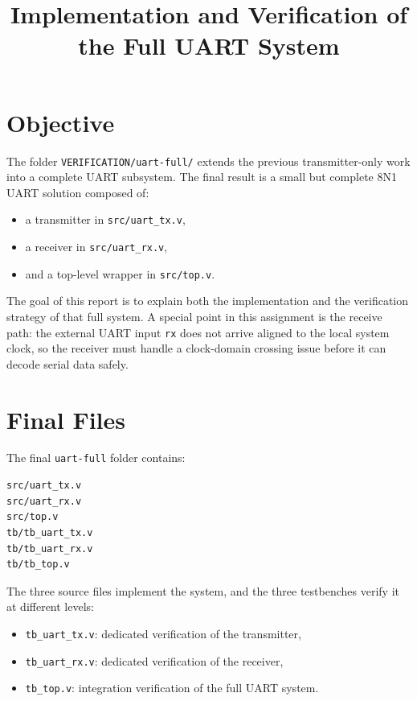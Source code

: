 \documentclass[12pt]{article}
\title{Implementation and Verification of the Full UART System}
\author{}
\date{}
\begin{document}
\maketitle

\section{Objective}

The folder \texttt{VERIFICATION/uart-full/} extends the previous
transmitter-only work into a complete UART subsystem. The final result is a
small but complete 8N1 UART solution composed of:

\begin{itemize}
    \item a transmitter in \texttt{src/uart\_tx.v},
    \item a receiver in \texttt{src/uart\_rx.v},
    \item and a top-level wrapper in \texttt{src/top.v}.
\end{itemize}

The goal of this report is to explain both the implementation and the
verification strategy of that full system. A special point in this assignment is
the receive path: the external UART input \texttt{rx} does not arrive aligned to
the local system clock, so the receiver must handle a clock-domain crossing
issue before it can decode serial data safely.

\section{Final Files}

The final \texttt{uart-full} folder contains:

\begin{lstlisting}[language=bash]
src/uart_tx.v
src/uart_rx.v
src/top.v
tb/tb_uart_tx.v
tb/tb_uart_rx.v
tb/tb_top.v
\end{lstlisting}

The three source files implement the system, and the three testbenches verify it
at different levels:

\begin{itemize}
    \item \texttt{tb\_uart\_tx.v}: dedicated verification of the transmitter,
    \item \texttt{tb\_uart\_rx.v}: dedicated verification of the receiver,
    \item \texttt{tb\_top.v}: integration verification of the full UART system.
\end{itemize}
\end{document}

